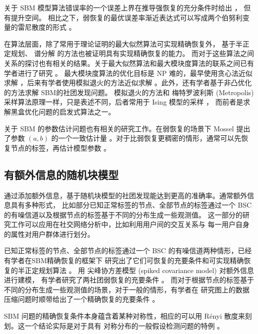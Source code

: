 关于 SBM 模型算法错误率的一个误差上界在推导强恢复的充分条件时给出 \cite{abbe2015exact}，
但有提升空间。
相比之下，弱恢复的最优误差率渐近表达式可以写成两个伯努利变量的雷尼散度的形式 \cite{zhang2016}。

在算法层面，除了常用于理论证明的最大似然算法可实现精确恢复外，
基于半正定规划\cite{hajek2016achieving}、
谱分解\cite{Yun2014} 的方法也被证明具有实现精确恢复的能力。
而对于这些算法之间关系的探讨也有相关的结果。关于最大似然算法和最大模块度算法的联系之间已有学者进行了研究 \cite{newman2016equivalence}。
最大模块度算法的优化目标是 NP 难的，最早使用贪心法近似求解 \cite{clauset2004finding}，后来有学者使用模拟退火的方法近似求解 \cite{he2016fast}。此外，还有学者基于非凸优化的方法求解 SBM的社团发现问题\cite{wang2021non}。
模拟退火的方法和 梅特罗波利斯 (Metropolis) 采样算法原理一样，只是表述不同，后者常用于 Ising 模型的采样 \cite{metropolis1953equation}，
而前者是求解黑盒优化问题的启发式算法之一。



关于 SBM 的参数估计问题也有相关的研究工作。在弱恢复的场景下 Mossel 提出了参数 $(a,b)$ 的一个一致估计量
\cite{mossel2015reconstruction}。对于比弱恢复更稠密的情形，通常可以先恢复节点的标签，再估计模型参数
\cite{abbe2015recovering}。

\subsection{有额外信息的随机块模型}
通过添加额外信息，基于随机块模型的社团发现能达到更高的准确率。通常额外信息具有多种形式，
比如部分已知正常标签的节点、全部节点的标签通过一个 BSC 的有噪信道以及根据节点的标签基于不同的分布生成一些观测值\cite{saad2018community}。
这一部分的研究工作可以应用在社交网络分析中，比如利用用户间的交互关系与
每一用户自身的属性对用户群体进行划分。

已知正常标签的节点、全部节点的标签通过一个 BSC 的有噪信道两种情形，已经有学者在SBM精确恢复的框架下
研究出了它们可恢复的充要条件和可实现精确恢复的半正定规划算法 \cite{esmaeili2019community, esmaeili2019exact}。
用 尖峰协方差模型 (spiked covariance model) 对额外信息
进行建模，
有学者研究了两社团弱恢复的充要条件 \cite{deshpande2018contextual}。
而对于根据节点的标签基于不同的分布生成一些观测值的场景，对于一般的情形，有学者在
研究图上的数据压缩问题时顺带给出了一个精确恢复的充要条件 \cite{abbe17sideinfo}。

SBM 问题的精确恢复条件本身蕴含着某种对称性，相应的可以用 Rényi 散度来刻划。这一个结论实际是对于具有
对称分布的一般假设检测问题的特例 \cite{gao2018community}。

